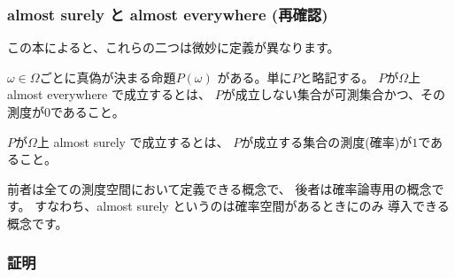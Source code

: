       \subsubsection{almost surely と almost everywhere (再確認)}
        この本によると、これらの二つは微妙に定義が異なります。

        $\omega \in \Omega$ごとに真偽が決まる命題$P(\omega)$
        がある。単に$P$と略記する。
        $P$が$\Omega$上 almost everywhere で成立するとは、
        $P$が成立しない集合が可測集合かつ、その測度が0であること。

        $P$が$\Omega$上 almost surely で成立するとは、
        $P$が成立する集合の測度(確率)が$1$であること。

        前者は全ての測度空間において定義できる概念で、
        後者は確率論専用の概念です。
        すなわち、almost surely というのは確率空間があるときにのみ
        導入できる概念です。

      \subsubsection{証明}

